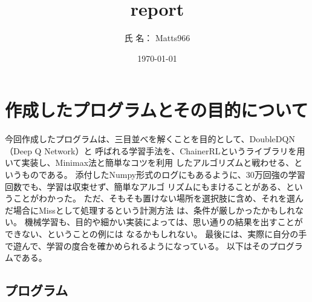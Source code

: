 \documentclass[11pt,a4paper]{jsarticle}
\title{report}
\author{氏 名： Matts966}
\date{\today}
\begin{document}
\maketitle
%
\section{
  作成したプログラムとその目的について
}
今回作成したプログラムは、三目並べを解くことを目的として、DoubleDQN（Deep Q Network）と
呼ばれる学習手法を、ChainerRLというライブラリを用いて実装し、Minimax法と簡単なコツを利用
したアルゴリズムと戦わせる、というものである。
添付したNumpy形式のログにもあるように、30万回強の学習回数でも、学習は収束せず、簡単なアルゴ
リズムにもまけることがある、ということがわかった。
ただ、そもそも置けない場所を選択肢に含め、それを選んだ場合にMissとして処理するという計測方法
は、条件が厳しかったかもしれない。
機械学習も、目的や細かい実装によっては、思い通りの結果を出すことができない、ということの例には
なるかもしれない。
最後には、実際に自分の手で遊んで、学習の度合を確かめられるようになっている。
以下はそのプログラムである。

\subsection{プログラム}
\label{sec:prog-list1}



\end{document}

